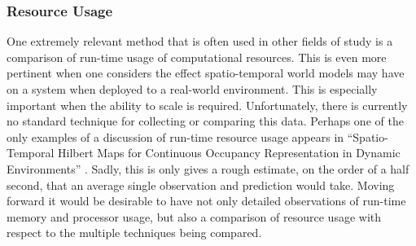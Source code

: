   \subsubsection { Resource Usage }

  One extremely relevant method that is often used in other fields of study
  is a comparison of run-time usage of computational resources. This is even
  more pertinent when one considers the effect spatio-temporal world models may
  have on a system when deployed to a real-world environment. This is especially
  important when the ability to scale is required. Unfortunately, there is currently
  no standard technique for collecting or comparing this data.
  Perhaps one of the only examples of a discussion of run-time resource usage
  appears in ``Spatio-Temporal Hilbert Maps for Continuous Occupancy Representation in Dynamic Environments'' \cite{Senanayake2016}.
  Sadly, this is only gives a rough estimate, on the order of a half second,
  that an average single observation and prediction would take. Moving forward
  it would be desirable to have not only detailed observations of run-time
  memory and processor usage, but also a comparison of resource usage with
  respect to the multiple techniques being compared. \\



